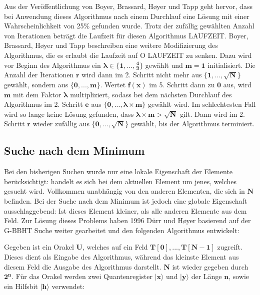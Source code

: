 Aus der Veröffentlichung von Boyer, Brassard, Høyer und Tapp geht hervor, dass bei Anwendung dieses Algorithmus nach einem Durchlauf eine Lösung mit einer Wahrscheinlichkeit von 25\% gefunden wurde. 
Trotz der zufällig gewählten Anzahl von Iterationen beträgt die Laufzeit für diesen Algorithmus LAUFZEIT.
Boyer, Brassard, Høyer und Tapp beschreiben eine weitere Modifizierung des Algorithmus, die es erlaubt die Laufzeit auf O LAUFZEIT zu senken. 
Dazu wird vor Beginn des Algorithmus ein $\mathbf{\pmb\lambda \in \{1, ..., \frac{4}{3} \} }$ gewählt und $\mathbf{m = 1}$ initialisiert. Die Anzahl der Iterationen $\mathbf{r}$ wird dann im 2. Schritt nicht mehr aus $\mathbf{\{1, ..., \sqrt{N}\}}$ gewählt, sondern aus $\mathbf{\{0, ..., m\}}$. 
Wertet $\mathbf{f(x)}$ im 5. Schritt dann zu $\mathbf{0}$ aus, wird $\mathbf{m}$ mit dem Faktor $\mathbf{\pmb\lambda}$ multipliziert, sodass bei dem nächsten Durchlauf des Algorithmus im 2. Schritt $\mathbf{e}$ aus $\mathbf{\{0, ..., \pmb\lambda \times m\}}$  gewählt wird. 
Im schlechtesten Fall wird so lange keine Lösung gefunden, dass $\mathbf{\pmb\lambda \times m > \sqrt{N}}$ gilt. Dann wird im 2. Schritt $\mathbf{r}$ wieder zufällig aus $\mathbf{\{0, ..., \sqrt{N}\}}$ gewählt, bis der Algorithmus terminiert. \cite[S. 141]{Ho99}


\subsection{Suche nach dem Minimum}
Bei den bisherigen Suchen wurde nur eine lokale Eigenschaft der Elemente berücksichtigt: handelt es sich bei dem aktuellen Element um jenes, welches gesucht wird. 
Vollkommen unabhängig von den anderen Elementen, die sich in $\mathbf{N}$ befinden. Bei der Suche nach dem Minimum ist jedoch eine globale Eigenschaft ausschlaggebend: Ist dieses Element kleiner, als alle anderen Elemente aus dem Feld.
Zur Lösung dieses Problems haben 1996 Dürr und Høyer basierend auf der G-BBHT Suche weiter gearbeitet und den folgenden Algorithmus entwickelt: 

Gegeben ist ein Orakel $\mathbf{U}$, welches auf ein Feld $\mathbf{T[0], ..., T[N-1]}$ zugreift. 
Dieses dient als Eingabe des Algorithmus, während das kleinste Element aus diesem Feld die Ausgabe des Algorithmus darstellt. $\mathbf{N}$ ist wieder gegeben durch $\mathbf{2^n}$. 
Für das Orakel werden zwei Quantenregister $\mathbf{|x\rangle}$ und $\mathbf{|y\rangle}$ der Länge $\mathbf{n}$, sowie ein Hilfsbit $\mathbf{|h\rangle}$ verwendet:

